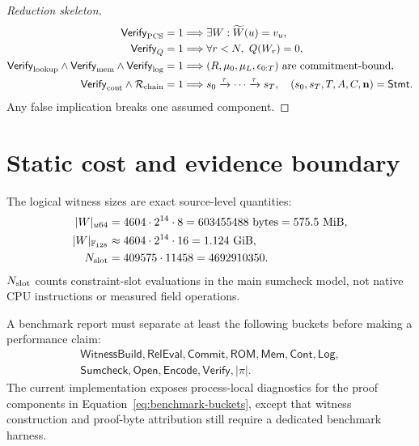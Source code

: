 \documentclass[10pt]{article}
\numberwithin{equation}{section}
\newcommand{\F}{\mathbb{F}}
\newcommand{\Verify}{\mathsf{Verify}}
\newcommand{\mle}{\widetilde}
\newcommand{\Stmt}{\mathsf{Stmt}}
\newcommand{\Rel}{\mathcal{R}}
\begin{document}
\begin{proof}[Reduction skeleton]
\begin{align*}
 \Verify_{\rm PCS}=1&\Longrightarrow \exists W:\mle W(u)=v_u,\\
 \Verify_Q=1&\Longrightarrow \forall r<N,\ Q(W_r)=0,\\
 \Verify_{\rm lookup}\wedge\Verify_{\rm mem}\wedge\Verify_{\rm log}=1
 &\Longrightarrow (R,\mu_0,\mu_L,\epsilon_{0:T})\ \text{are commitment-bound},\\
 \Verify_{\rm cont}\wedge\Rel_{\rm chain}=1
 &\Longrightarrow s_0\xrightarrow{\tau}\cdots\xrightarrow{\tau}s_T,\quad
 (s_0,s_T,T,A,C,\mathbf n)=\Stmt.
\end{align*}
Any false implication breaks one assumed component.
\end{proof}

\section{Static cost and evidence boundary}

The logical witness sizes are exact source-level quantities:
\begin{align}
 |W|_{u64}&=4604\cdot2^{14}\cdot8
 =603455488\ \text{bytes}=575.5\ \text{MiB},\\
 |W|_{\F_{128}}&\approx4604\cdot2^{14}\cdot16
 =1.124\ \text{GiB},\\
 N_{\rm slot}&=409575\cdot11458=4692910350.
 \label{eq:static-cost}
\end{align}
$N_{\rm slot}$ counts constraint-slot evaluations in the main sumcheck model, not native CPU
instructions or measured field operations.

A benchmark report must separate at least the following buckets before making a performance
claim:
\begin{equation}
\begin{gathered}
\mathsf{WitnessBuild},\mathsf{RelEval},\mathsf{Commit},\mathsf{ROM},
\mathsf{Mem},\mathsf{Cont},\mathsf{Log},\\
\mathsf{Sumcheck},\mathsf{Open},\mathsf{Encode},\mathsf{Verify},|\pi|.
\end{gathered}
\label{eq:benchmark-buckets}
\end{equation}
The current implementation exposes process-local diagnostics for the proof components in
Equation~\eqref{eq:benchmark-buckets}, except that witness construction and proof-byte attribution
still require a dedicated benchmark harness.
\end{document}

